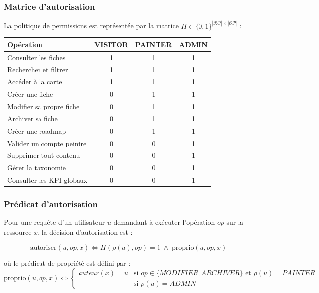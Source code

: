 \documentclass[12pt,a4paper]{report}
\begin{document}
\subsubsection*{Matrice d'autorisation}

La politique de permissions est représentée par la matrice $\Pi \in \{0,1\}^{|\mathcal{R\!O}| \times |\mathcal{O\!P}|}$ :

\begin{center}
\renewcommand{\arraystretch}{1.3}
\begin{tabular}{lccc}
\toprule
\textbf{Opération} & \textbf{VISITOR} & \textbf{PAINTER} & \textbf{ADMIN} \\
\midrule
Consulter les fiches           & 1 & 1 & 1 \\
Rechercher et filtrer          & 1 & 1 & 1 \\
Accéder à la carte             & 1 & 1 & 1 \\
Créer une fiche                & 0 & 1 & 1 \\
Modifier sa propre fiche       & 0 & 1 & 1 \\
Archiver sa fiche              & 0 & 1 & 1 \\
Créer une roadmap              & 0 & 1 & 1 \\
Valider un compte peintre      & 0 & 0 & 1 \\
Supprimer tout contenu         & 0 & 0 & 1 \\
Gérer la taxonomie             & 0 & 0 & 1 \\
Consulter les KPI globaux      & 0 & 0 & 1 \\
\bottomrule
\end{tabular}
\end{center}

\subsubsection*{Prédicat d'autorisation}

Pour une requête d'un utilisateur $u$ demandant à exécuter l'opération $op$ sur
la ressource $x$, la décision d'autorisation est :

\[
\text{autoriser}(u, op, x) \iff \Pi(\rho(u), op) = 1 \;\land\; \text{proprio}(u, op, x)
\]

où le prédicat de propriété est défini par :
\[
\text{proprio}(u, op, x) \iff
\begin{cases}
auteur(x) = u & \text{si } op \in \{MODIFIER, ARCHIVER\} \text{ et } \rho(u) = PAINTER \\
\top            & \text{si } \rho(u) = ADMIN
\end{cases}
\]
\end{document}
